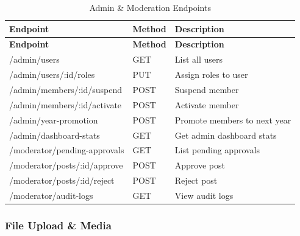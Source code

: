\documentclass[12pt,a4paper]{article}
\begin{document}
\begin{longtable}{>{\small\ttfamily}p{6.5cm}%
                  >{\small\centering\arraybackslash}p{1.3cm}%
                  >{\small}p{6.7cm}}
\caption{Admin \& Moderation Endpoints} \\

\rowcolor{Teal}
\color{white}\normalfont\bfseries Endpoint & \color{white}\bfseries Method & \color{white}\bfseries Description \\
\endfirsthead
\rowcolor{Teal}
\color{white}\normalfont\bfseries Endpoint & \color{white}\bfseries Method & \color{white}\bfseries Description \\
\endhead

\midrule
\rowcolor{LightTeal}/admin/users & GET & List all users \\
/admin/users/:id/roles & PUT & Assign roles to user \\
\rowcolor{LightTeal}/admin/members/:id/suspend & POST & Suspend member \\
/admin/members/:id/activate & POST & Activate member \\
\rowcolor{LightTeal}/admin/year-promotion & POST & Promote members to next year \\
/admin/dashboard-stats & GET & Get admin dashboard stats \\
\rowcolor{LightTeal}/moderator/pending-approvals & GET & List pending approvals \\
/moderator/posts/:id/approve & POST & Approve post \\
\rowcolor{LightTeal}/moderator/posts/:id/reject & POST & Reject post \\
/moderator/audit-logs & GET & View audit logs \\
\bottomrule
\end{longtable}

\subsubsection{File Upload \& Media}
\end{document}
